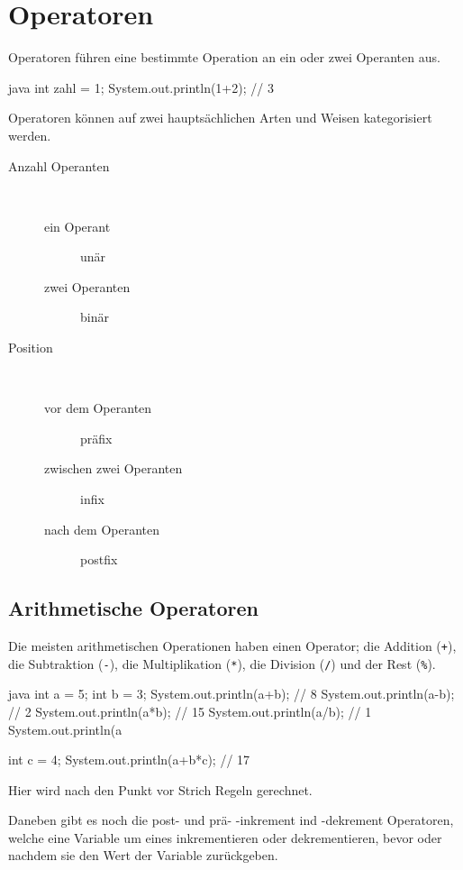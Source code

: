 \documentclass{article}
\begin{document}
\section{Operatoren} 
Operatoren führen eine bestimmte Operation an ein oder zwei Operanten aus.
\begin{sourcecode}{java}
int zahl = 1;
System.out.println(1+2); // 3
\end{sourcecode}
Operatoren können auf zwei hauptsächlichen Arten und Weisen kategorisiert werden.
\begin{description}
 \item[Anzahl Operanten]~
 \begin{description}
  \item[ein Operant] unär
  \item[zwei Operanten] binär
 \end{description}
 \item[Position]~\begin{description}
  \item[vor dem Operanten] präfix
  \item[zwischen zwei Operanten] infix 
  \item[nach dem Operanten] postfix
 \end{description} 
\end{description}

\subsection{Arithmetische Operatoren}
Die meisten arithmetischen Operationen haben einen Operator; die Addition (\texttt{+}), die Subtraktion (\texttt{-}), die Multiplikation (\texttt{*}), die Division (\texttt{/}) und der Rest (\texttt{\%}).
\begin{sourcecode}{java}
int a = 5;
int b = 3;
System.out.println(a+b); // 8
System.out.println(a-b); // 2
System.out.println(a*b); // 15
System.out.println(a/b); // 1
System.out.println(a%

int c = 4;
System.out.println(a+b*c); // 17
\end{sourcecode}
Hier wird nach den Punkt vor Strich Regeln gerechnet.

Daneben gibt es noch die post- und prä- -inkrement ind -dekrement Operatoren, welche eine Variable um eines inkrementieren oder dekrementieren, bevor oder nachdem sie den Wert der Variable zurückgeben.
\end{document}
